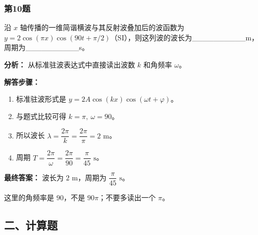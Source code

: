 \documentclass[12pt,a4paper]{ctexart}
\begin{document}
\subsubsection*{第10题}
\begin{tcolorbox}[colback=gray!2!white,colframe=black!60,title={题目}]
沿 \(x\) 轴传播的一维简谐横波与其反射波叠加后的波函数为 \(y=2\cos(\pi x)\cos(90t+\pi/2)\)（SI），则这列波的波长为\_\_\_\_\_\_\_\_\_\_m，周期为\_\_\_\_\_\_\_\_\_\_s。\par
\end{tcolorbox}
\begin{tcolorbox}[colback=blue!2!white,colframe=blue!55!black,title={完整答案}]
\textbf{分析：}
从标准驻波表达式中直接读出波数 \(k\) 和角频率 \(\omega\)。\par
\textbf{解答步骤：}
\begin{enumerate}
\item 标准驻波形式是 \(y=2A\cos(kx)\cos(\omega t+\varphi)\)。
\item 与题式比较可得 \(k=\pi,\ \omega=90\)。
\item 所以波长 \(\lambda=\dfrac{2\pi}{k}=\dfrac{2\pi}{\pi}=2\text{ m}\)。
\item 周期 \(T=\dfrac{2\pi}{\omega}=\dfrac{2\pi}{90}=\dfrac{\pi}{45}\text{ s}\)。
\end{enumerate}
\textbf{最终答案：}
波长为 \(2\text{ m}\)，周期为 \(\dfrac{\pi}{45}\text{ s}\)。\par
\end{tcolorbox}
\begin{tcolorbox}[colback=red!2!white,colframe=red!55!black,title={易错点}]
这里的角频率是 \(90\)，不是 \(90\pi\)；不要多读出一个 \(\pi\)。\par
\end{tcolorbox}


\subsection*{二、计算题}
\end{document}
